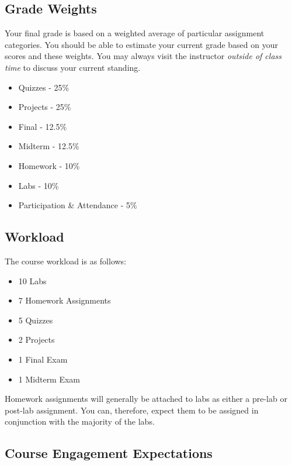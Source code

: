 \documentclass[10pt]{article}
\begin{document}
\subsection{Grade Weights}
Your final grade is based on a weighted average of particular assignment categories.  You should be able to estimate your current grade based on your scores and these weights.  You may always visit the instructor \textit{outside of class time} to discuss your current standing.  
\begin{itemize}
\item Quizzes - 25\%
\item Projects - 25\%
\item Final - 12.5\%
\item Midterm - 12.5\%
\item Homework - 10\%
\item Labs - 10\%
\item Participation \& Attendance - 5\%
\end{itemize} 

\subsection{Workload}
The course workload is as follows:
\begin{itemize}
\item 10 Labs
\item 7 Homework Assignments
\item 5 Quizzes
\item 2 Projects
\item 1 Final Exam
\item 1 Midterm Exam
\end{itemize}

Homework assignments will generally be attached to labs as either a pre-lab or post-lab assignment. You can, therefore, expect them to be assigned in conjunction with the majority of the labs.

\subsection{Course Engagement Expectations}
\end{document}
